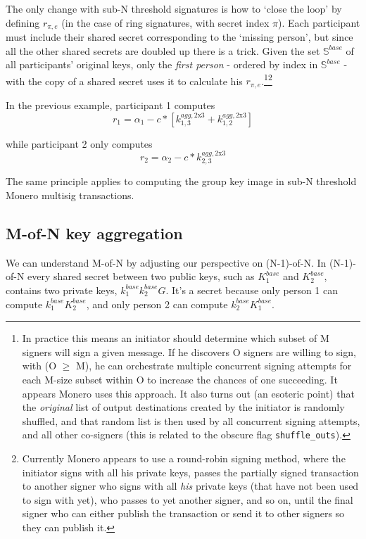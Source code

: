 The only change with sub-N threshold signatures is how to `close the loop' by defining $r_{\pi,e}$ (in the case of ring signatures, with secret index $\pi$). Each participant must include their shared secret corresponding to the `missing person', but since all the other shared secrets are doubled up there is a trick. Given the set $\mathbb{S}^{base}$ of all participants' original keys, only the {\em first person} - ordered by index in $\mathbb{S}^{base}$ - with the copy of a shared secret uses it to calculate his $r_{\pi,e}$.\footnote{In practice this means an initiator should determine which subset of M signers will sign a given message. If he discovers O signers are willing to sign, with (O $\geq$ M), he can orchestrate multiple concurrent signing attempts for each M-size subset within O to increase the chances of one succeeding. It appears Monero uses this approach. It also turns out (an esoteric point) that the {\em original} list of output destinations created by the initiator is randomly shuffled, and that random list is then used by all concurrent signing attempts, and all other co-signers (this is related to the obscure flag {\tt shuffle\_outs}).}\footnote{Currently Monero appears to use a round-robin signing method, where the initiator signs with all his private keys, passes the partially signed transaction to another signer who signs with all {\em his} private keys (that have not been used to sign with yet), who passes to yet another signer, and so on, until the final signer who can either publish the transaction or send it to other signers so they can publish it.}

In the previous example, participant 1 computes\vspace{.175cm}
\[r_1 = \alpha_1 - c*[k^{agg,\textrm{2x3}}_{1,3} + k^{agg,\textrm{2x3}}_{1,2}]\]

while participant 2 only computes
\[r_2 = \alpha_2 - c*k^{agg,\textrm{2x3}}_{2,3}\]

The same principle applies to computing the group key image in sub-N threshold Monero multisig transactions.


\subsection{M-of-N key aggregation}
\label{sec:m-of-n}

We can understand M-of-N by adjusting our perspective on (N-1)-of-N. In (N-1)-of-N every shared secret between two public keys, such as $K^{base}_1$ and $K^{base}_2$, contains two private keys, $k^{base}_1 k^{base}_2 G$. It's a secret because only person 1 can compute $k^{base}_1 K^{base}_2$, and only person 2 can compute $k^{base}_2 K^{base}_1$.

